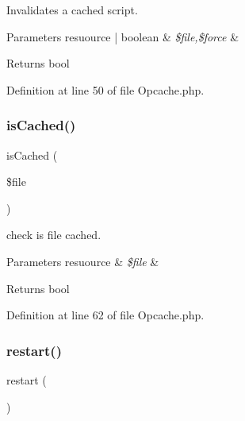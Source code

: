 Invalidates a cached script.


\begin{DoxyParams}[1]{Parameters}
resuource | boolean & {\em \$file,\$force} & \\
\hline
\end{DoxyParams}
\begin{DoxyReturn}{Returns}
bool 
\end{DoxyReturn}


Definition at line 50 of file Opcache.\+php.

\mbox{\label{class_zest_1_1_cache_1_1_opcache_1_1_opcache_a02c7b2a1dc98a6a9b46af81f968a0c8c}} 
\subsubsection{\texorpdfstring{is\+Cached()}{isCached()}}
{\footnotesize\ttfamily is\+Cached (\begin{DoxyParamCaption}\item[{}]{\$file }\end{DoxyParamCaption})}

check is file cached.


\begin{DoxyParams}[1]{Parameters}
resuource & {\em \$file} & \\
\hline
\end{DoxyParams}
\begin{DoxyReturn}{Returns}
bool 
\end{DoxyReturn}


Definition at line 62 of file Opcache.\+php.

\mbox{\label{class_zest_1_1_cache_1_1_opcache_1_1_opcache_ac8de9e38ce27c87f710dff42a13455cf}} 
\subsubsection{\texorpdfstring{restart()}{restart()}}
{\footnotesize\ttfamily restart (\begin{DoxyParamCaption}{ }\end{DoxyParamCaption})}

